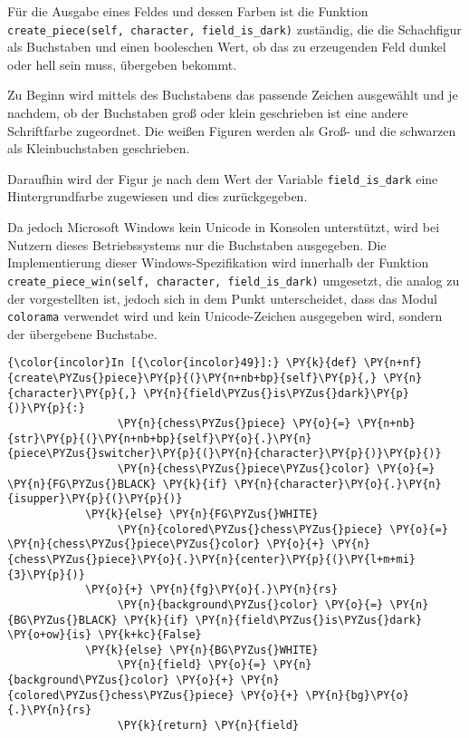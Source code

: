     Für die Ausgabe eines Feldes und dessen Farben ist die Funktion
\texttt{create\_piece(self,\ character,\ field\_is\_dark)} zuständig,
die die Schachfigur als Buchstaben und einen booleschen Wert, ob das zu
erzeugenden Feld dunkel oder hell sein muss, übergeben bekommt.

Zu Beginn wird mittels des Buchstabens das passende Zeichen ausgewählt
und je nachdem, ob der Buchstaben groß oder klein geschrieben ist eine
andere Schriftfarbe zugeordnet. Die weißen Figuren werden als Groß- und
die schwarzen als Kleinbuchstaben geschrieben.

Daraufhin wird der Figur je nach dem Wert der Variable
\texttt{field\_is\_dark} eine Hintergrundfarbe zugewiesen und dies
zurückgegeben.

Da jedoch Microsoft Windows kein Unicode in Konsolen unterstützt, wird
bei Nutzern dieses Betriebssystems nur die Buchstaben ausgegeben. Die
Implementierung dieser Windows-Spezifikation wird innerhalb der Funktion
\texttt{create\_piece\_win(self,\ character,\ field\_is\_dark)}
umgesetzt, die analog zu der vorgestellten ist, jedoch sich in dem Punkt
unterscheidet, dass das Modul \texttt{colorama} verwendet wird und kein
Unicode-Zeichen ausgegeben wird, sondern der übergebene Buchstabe.

    \begin{Verbatim}[commandchars=\\\{\}]
{\color{incolor}In [{\color{incolor}49}]:} \PY{k}{def} \PY{n+nf}{create\PYZus{}piece}\PY{p}{(}\PY{n+nb+bp}{self}\PY{p}{,} \PY{n}{character}\PY{p}{,} \PY{n}{field\PYZus{}is\PYZus{}dark}\PY{p}{)}\PY{p}{:}
                 \PY{n}{chess\PYZus{}piece} \PY{o}{=} \PY{n+nb}{str}\PY{p}{(}\PY{n+nb+bp}{self}\PY{o}{.}\PY{n}{piece\PYZus{}switcher}\PY{p}{(}\PY{n}{character}\PY{p}{)}\PY{p}{)}
                 \PY{n}{chess\PYZus{}piece\PYZus{}color} \PY{o}{=} \PY{n}{FG\PYZus{}BLACK} \PY{k}{if} \PY{n}{character}\PY{o}{.}\PY{n}{isupper}\PY{p}{(}\PY{p}{)} 
			\PY{k}{else} \PY{n}{FG\PYZus{}WHITE}
                 \PY{n}{colored\PYZus{}chess\PYZus{}piece} \PY{o}{=} \PY{n}{chess\PYZus{}piece\PYZus{}color} \PY{o}{+} \PY{n}{chess\PYZus{}piece}\PY{o}{.}\PY{n}{center}\PY{p}{(}\PY{l+m+mi}{3}\PY{p}{)} 
			\PY{o}{+} \PY{n}{fg}\PY{o}{.}\PY{n}{rs}
                 \PY{n}{background\PYZus{}color} \PY{o}{=} \PY{n}{BG\PYZus{}BLACK} \PY{k}{if} \PY{n}{field\PYZus{}is\PYZus{}dark} \PY{o+ow}{is} \PY{k+kc}{False} 
			\PY{k}{else} \PY{n}{BG\PYZus{}WHITE}
                 \PY{n}{field} \PY{o}{=} \PY{n}{background\PYZus{}color} \PY{o}{+} \PY{n}{colored\PYZus{}chess\PYZus{}piece} \PY{o}{+} \PY{n}{bg}\PY{o}{.}\PY{n}{rs}
                 \PY{k}{return} \PY{n}{field}
\end{Verbatim}

